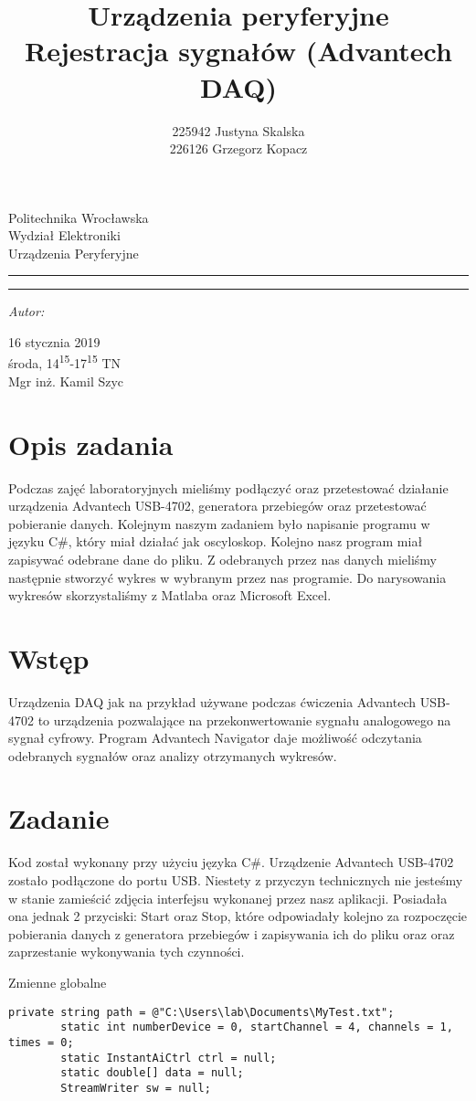 \documentclass{article}
\author{225942 Justyna Skalska \\
        226126 Grzegorz Kopacz}
\title{\textbf{Urządzenia peryferyjne}\\
\normalsize{Rejestracja sygnałów (Advantech DAQ)}}
\makeatletter
\newcommand{\linia}{\rule{\linewidth}{0.4mm}}
\renewcommand{\maketitle}{\begin{titlepage}
    \vspace*{1cm}
    \begin{center}\small
    Politechnika Wrocławska\\
    Wydział Elektroniki\\
    Urządzenia Peryferyjne
    \end{center}
    \vspace{3cm}
    \noindent\linia
    \begin{center}
      \LARGE \textsc{\@title}
         \end{center}
     \linia
    \vspace{0.5cm}
    \begin{flushright}
    \begin{minipage}{7cm}
    \textit{\small Autor:}\\
    \normalsize \textsc{\@author} \par
    \end{minipage}
    \vspace{5cm}

    16 stycznia 2019\\
     {\small środa, 14\textsuperscript{15}-17\textsuperscript{15} TN}\\
        Mgr inż. Kamil Szyc
        
     \end{flushright}
    \vspace*{\stretch{6}}
    \begin{center}
    \end{center}
  \end{titlepage}
}
\makeatother
\begin{document}
\maketitle
\tableofcontents

\newpage

\section{Opis zadania}
Podczas zajęć laboratoryjnych mieliśmy podłączyć oraz przetestować działanie urządzenia Advantech USB-4702, generatora przebiegów oraz przetestować pobieranie danych. Kolejnym naszym zadaniem było napisanie programu w języku C\#, który miał działać jak oscyloskop. Kolejno nasz program miał zapisywać odebrane dane do pliku. Z odebranych przez nas danych mieliśmy następnie stworzyć wykres w wybranym przez nas programie. Do narysowania wykresów skorzystaliśmy z Matlaba oraz Microsoft Excel.

\section{Wstęp} 
Urządzenia DAQ jak na przykład używane podczas ćwiczenia Advantech USB-4702 to urządzenia pozwalające na przekonwertowanie sygnału analogowego na sygnał cyfrowy. Program Advantech Navigator daje możliwość odczytania odebranych sygnałów oraz analizy otrzymanych wykresów. 


\section{Zadanie}
Kod został wykonany przy użyciu języka C\#. Urządzenie Advantech USB-4702 zostało podłączone do portu USB. Niestety z przyczyn technicznych nie jesteśmy w stanie zamieścić zdjęcia interfejsu wykonanej przez nasz aplikacji. Posiadała ona jednak 2 przyciski: Start oraz Stop, które odpowiadały kolejno za rozpoczęcie pobierania danych z generatora przebiegów i zapisywania ich do pliku oraz oraz zaprzestanie wykonywania tych czynności.
\newline
\newline

\begin{listing}
\caption{Zmienne globalne}
\begin{verbatim}
private string path = @"C:\Users\lab\Documents\MyTest.txt";
        static int numberDevice = 0, startChannel = 4, channels = 1, times = 0;
        static InstantAiCtrl ctrl = null;
        static double[] data = null;
        StreamWriter sw = null;
\end{verbatim}
\label{lst:global}
\end{listing}
\end{document}
